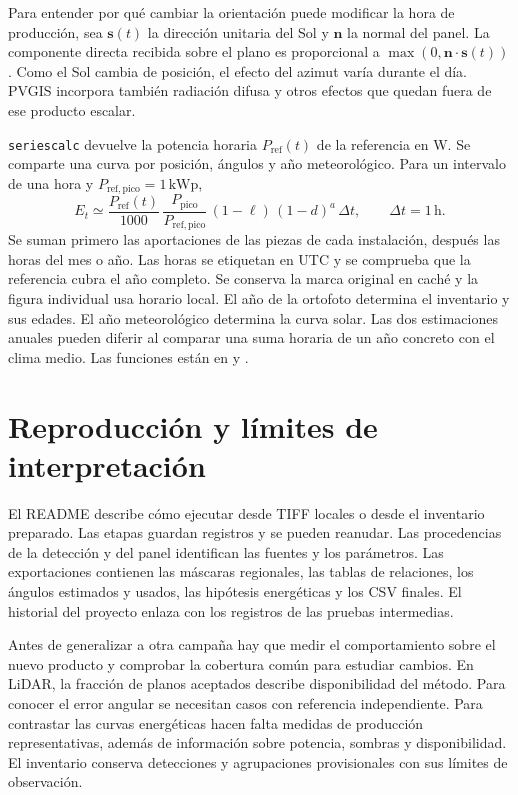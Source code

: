 \documentclass[11pt,a4paper]{article}
\begin{document}
Para entender por qué cambiar la orientación puede modificar la hora de producción, sea \(\mathbf s(t)\) la dirección unitaria del Sol y \(\mathbf n\) la normal del panel. La componente directa recibida sobre el plano es proporcional a \(\max(0,\mathbf n\cdot\mathbf s(t))\). Como el Sol cambia de posición, el efecto del azimut varía durante el día. PVGIS incorpora también radiación difusa y otros efectos que quedan fuera de ese producto escalar. \cite{pvgis}

\texttt{seriescalc} devuelve la potencia horaria \(P_{\mathrm{ref}}(t)\) de la referencia en W. Se comparte una curva por posición, ángulos y año meteorológico. Para un intervalo de una hora y \(P_{\mathrm{ref,pico}}=1\,\mathrm{kWp}\),
\[
E_t\simeq
\frac{P_{\mathrm{ref}}(t)}{1000}\,
\frac{P_{\mathrm{pico}}}{P_{\mathrm{ref,pico}}}\,
(1-\ell)\,(1-d)^a\,\Delta t,\qquad \Delta t=1\,\mathrm{h}.
\]
Se suman primero las aportaciones de las piezas de cada instalación, después las horas del mes o año. Las horas se etiquetan en UTC y se comprueba que la referencia cubra el año completo. Se conserva la marca original en caché y la figura individual usa horario local. El año de la ortofoto determina el inventario y sus edades. El año meteorológico determina la curva solar. Las dos estimaciones anuales pueden diferir al comparar una suma horaria de un año concreto con el clima medio. Las funciones están en  y .

\section{Reproducción y límites de interpretación}

El README describe cómo ejecutar  desde TIFF locales o desde el inventario preparado. Las etapas guardan registros y se pueden reanudar. Las procedencias de la detección y del panel identifican las fuentes y los parámetros. Las exportaciones contienen las máscaras regionales, las tablas de relaciones, los ángulos estimados y usados, las hipótesis energéticas y los CSV finales. El historial del proyecto enlaza con los registros de las pruebas intermedias.

Antes de generalizar a otra campaña hay que medir el comportamiento sobre el nuevo producto y comprobar la cobertura común para estudiar cambios. En LiDAR, la fracción de planos aceptados describe disponibilidad del método. Para conocer el error angular se necesitan casos con referencia independiente. Para contrastar las curvas energéticas hacen falta medidas de producción representativas, además de información sobre potencia, sombras y disponibilidad. El inventario conserva detecciones y agrupaciones provisionales con sus límites de observación.
\end{document}
